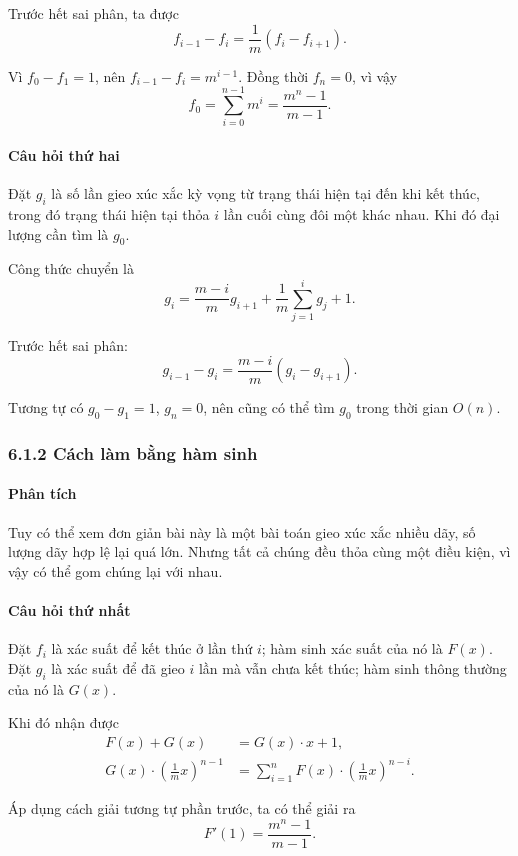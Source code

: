 \documentclass[11pt]{article}
\begin{document}
Trước hết sai phân, ta được
\[
  f_{i-1}-f_i=\frac{1}{m}(f_i-f_{i+1}).
\]

Vì \(f_0-f_1=1\), nên \(f_{i-1}-f_i=m^{i-1}\). Đồng thời \(f_n=0\), vì vậy
\[
  f_0=\sum_{i=0}^{n-1}m^i=\frac{m^n-1}{m-1}.
\]

\paragraph{Câu hỏi thứ hai}
Đặt \(g_i\) là số lần gieo xúc xắc kỳ vọng từ trạng thái hiện tại đến khi kết
thúc, trong đó trạng thái hiện tại thỏa \(i\) lần cuối cùng đôi một khác nhau.
Khi đó đại lượng cần tìm là \(g_0\).

Công thức chuyển là
\[
  g_i=\frac{m-i}{m}g_{i+1}+\frac{1}{m}\sum_{j=1}^{i}g_j+1 .
\]

Trước hết sai phân:
\[
  g_{i-1}-g_i=\frac{m-i}{m}(g_i-g_{i+1}).
\]

Tương tự có \(g_0-g_1=1\), \(g_n=0\), nên cũng có thể tìm \(g_0\) trong thời
gian \(O(n)\).

\subsubsection*{6.1.2 Cách làm bằng hàm sinh}

\paragraph{Phân tích}
Tuy có thể xem đơn giản bài này là một bài toán gieo xúc xắc nhiều dãy, số lượng
dãy hợp lệ lại quá lớn. Nhưng tất cả chúng đều thỏa cùng một điều kiện, vì vậy
có thể gom chúng lại với nhau.

\paragraph{Câu hỏi thứ nhất}
Đặt \(f_i\) là xác suất để kết thúc ở lần thứ \(i\); hàm sinh xác suất của nó là
\(F(x)\). Đặt \(g_i\) là xác suất để đã gieo \(i\) lần mà vẫn chưa kết thúc; hàm
sinh thông thường của nó là \(G(x)\).

Khi đó nhận được
\begin{align}
  F(x)+G(x)&=G(x)\cdot x+1, \tag{7}\\
  G(x)\cdot\left(\frac{1}{m}x\right)^{n-1}
    &=\sum_{i=1}^{n}F(x)\cdot\left(\frac{1}{m}x\right)^{n-i}. \tag{8}
\end{align}

Áp dụng cách giải tương tự phần trước, ta có thể giải ra
\[
  F'(1)=\frac{m^n-1}{m-1}.
\]
\end{document}
